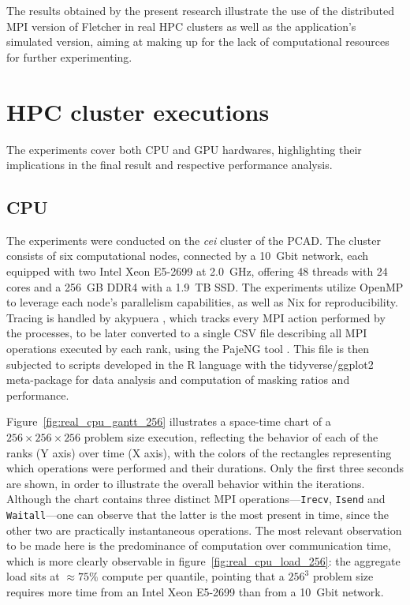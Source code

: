 \documentclass[cic,tc,english]{infufrgs}
\begin{document}
The results obtained by the present research illustrate the use
of the distributed MPI version of Fletcher in real HPC clusters
as well as the application's simulated version, aiming at making
up for the lack of computational resources for further experimenting.

\section{HPC cluster executions}

The experiments cover both CPU and GPU hardwares, highlighting their
implications
in the final result and respective performance analysis.

\subsection{CPU}

The experiments were conducted on the \textit{cei} cluster of the
PCAD. The cluster consists of six computational nodes, connected by
a 10~Gbit network, each equipped with two Intel Xeon E5-2699 at
2.0~GHz, offering 48 threads with 24
cores and a 256~GB DDR4 with a 1.9~TB SSD. The experiments utilize
OpenMP to leverage each node's parallelism capabilities, as well
as Nix for reproducibility. Tracing is handled by akypuera
\cite{akypuera}, which tracks every MPI action performed by
the processes, to be later converted to a single CSV file
describing all MPI operations executed by each rank, using the
PajeNG tool \cite{pajeng}. This file is then subjected to scripts
developed in the R language with the tidyverse/ggplot2 meta-package
for data analysis and computation of masking ratios and performance.

Figure~\ref{fig:real_cpu_gantt_256}
illustrates a space-time chart of a $256 \times 256 \times 256$
problem size execution, reflecting the behavior of each of the ranks
(Y axis) over time (X
axis), with the colors of the rectangles representing which operations
were performed and their durations. Only the first three seconds are shown, in
order to illustrate the overall behavior within the iterations. Although
the chart contains three distinct MPI operations---\texttt{Irecv},
\texttt{Isend}
and \texttt{Waitall}---one can observe that the latter is the most
present in time,
since the other two are practically instantaneous operations. The most relevant
observation to be made here is the predominance of computation over
communication time, which is more clearly observable in
figure~\ref{fig:real_cpu_load_256}:
the aggregate load sits at $\approx 75\%$ compute per quantile, pointing that
a $256^3$ problem size requires more time from an Intel Xeon E5-2699 than from
a 10~Gbit network.
\end{document}
